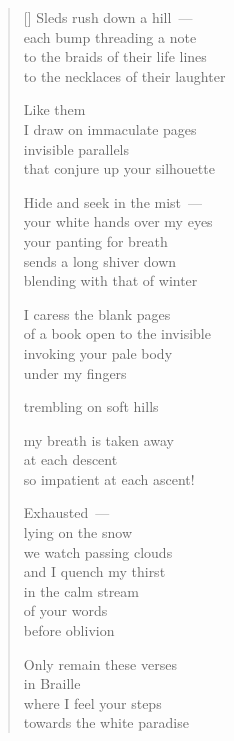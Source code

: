 \documentclass[12pt,a4paper]{article}
\begin{document}

\newpage

\poemtitle{}

\settowidth{\versewidth}{to the necklaces of their laughter}

\bigskip

\begin{verse}[\versewidth]
  Sleds rush down a hill~--- \\
  each bump threading a note \\
  to the braids of their life lines \\
  to the necklaces of their laughter

  Like them \\
  I draw on immaculate pages \\
  invisible parallels \\
  that conjure up your silhouette

  Hide and seek in the mist~--- \\
  your white hands over my eyes \\
  your panting for breath \\
  sends a long shiver down \\
  blending with that of winter

  I caress the blank pages \\
  of a book open to the invisible \\
  invoking your pale body \\
  under my fingers

  trembling on soft hills

  my breath is taken away \\
  at each descent \\
  so impatient at each ascent!

  Exhausted~--- \\
  lying on the snow \\
  we watch passing clouds \\
  and I quench my thirst \\
  in the calm stream \\
  of your words \\
  before oblivion

  Only remain these verses \\
  in Braille \\
  where I feel your steps \\
  towards the white paradise
\end{verse}
\end{document}
